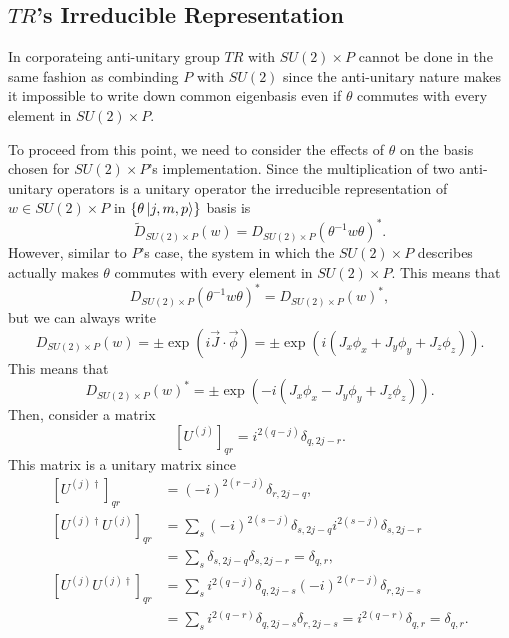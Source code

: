 \documentclass[preprint, 12pt]{revtex4-2}
\numberwithin{equation}{section}
\begin{document}
\subsection{$TR$'s Irreducible Representation}
In corporateing anti-unitary group $TR$ with $SU(2)\times P$ cannot be done in the same fashion as combinding $P$ with $SU(2)$ since the anti-unitary nature makes it impossible to write down common eigenbasis even if $\theta$ commutes with every element in $SU(2)\times P$.

To proceed from this point, we need to consider the effects of $\theta$ on the basis chosen for $SU(2)\times P$'s implementation. Since the multiplication of two anti-unitary operators is a unitary operator the irreducible representation of $w\in SU(2)\times P$ in $\{\theta\ket{j, m, p}\}$ basis is
\begin{equation}
    \tilde{D}_{SU(2)\times P}(w) = D_{SU(2)\times P}(\theta^{-1}w\theta)^\ast.
\end{equation}
However, similar to $P$'s case, the system in which the $SU(2)\times P$ describes actually makes $\theta$ commutes with every element in $SU(2)\times P$. This means that 
\begin{equation}
    D_{SU(2)\times P}(\theta^{-1}w\theta)^\ast = D_{SU(2)\times P}(w)^\ast,
\end{equation}
but we can always write
\begin{equation}
    D_{SU(2)\times P}(w) = \pm\exp(i\vec{J}\cdot\vec{\phi}) = \pm\exp(i(J_x\phi_x+J_y\phi_y+J_z\phi_z)).
\end{equation}
This means that
\begin{equation}
    D_{SU(2)\times P}(w)^\ast = \pm\exp(-i(J_x\phi_x-J_y\phi_y+J_z\phi_z)).
\end{equation}
Then, consider a matrix
\begin{equation}
    \left[U^{(j)}\right]_{qr} = i^{2(q-j)}\delta_{q,2j-r}.
\end{equation}
This matrix is a unitary matrix since
\begin{equation}
    \begin{aligned}
        \left[U^{(j)\dagger}\right]_{qr} &= (-i)^{2(r-j)}\delta_{r,2j-q}, \\
        \left[U^{(j)\dagger}U^{(j)}\right]_{qr} &= \sum_s(-i)^{2(s-j)}\delta_{s,2j-q}i^{2(s-j)}\delta_{s,2j-r} \\
        &= \sum_s\delta_{s,2j-q}\delta_{s,2j-r} = \delta_{q,r}, \\
        \left[U^{(j)}U^{(j)\dagger}\right]_{qr} &= \sum_si^{2(q-j)}\delta_{q,2j-s}(-i)^{2(r-j)}\delta_{r,2j-s} \\
        &= \sum_si^{2(q-r)}\delta_{q,2j-s}\delta_{r,2j-s} = i^{2(q-r)}\delta_{q,r} = \delta_{q,r}.
    \end{aligned}
\end{equation}
\end{document}
